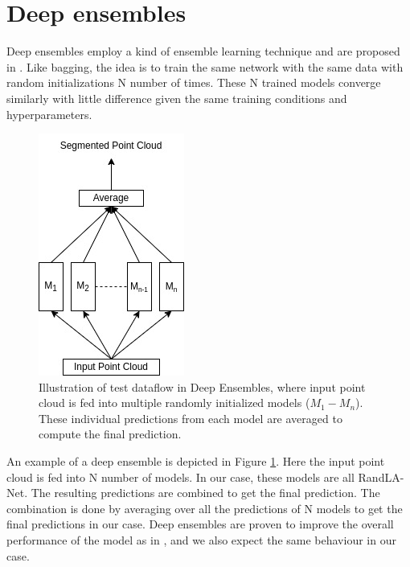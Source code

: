 \section{Deep ensembles}
\label{sec:meth_deepensembles}
Deep ensembles employ a kind of ensemble learning technique and are proposed in \cite{lakshminarayanan2016simple}.
Like bagging, the idea is to train the same network with the same data with random initializations N number of times.
These N trained models converge similarly with little difference given the same training conditions and hyperparameters.
\begin{figure}
    \centering
    \includegraphics[scale=0.4]{images/DE.jpg}
    \caption{Illustration of test dataflow in Deep Ensembles, where input point cloud is fed into multiple randomly initialized models ($M_1-M_n$). 
    These individual predictions from each model are averaged to compute the final prediction.}
    \label{fig:deepensembles}
\end{figure}
An example of a deep ensemble is depicted in Figure \ref{fig:deepensembles}.
Here the input point cloud is fed into N number of models. In our case, these models are all RandLA-Net.
The resulting predictions are combined to get the final prediction. 
The combination is done by averaging over all the predictions of N models to get the final predictions in our case.
Deep ensembles are proven to improve the overall performance of the model as in \cite{bhandary2020evaluating}, and we also expect the same behaviour in our case.

